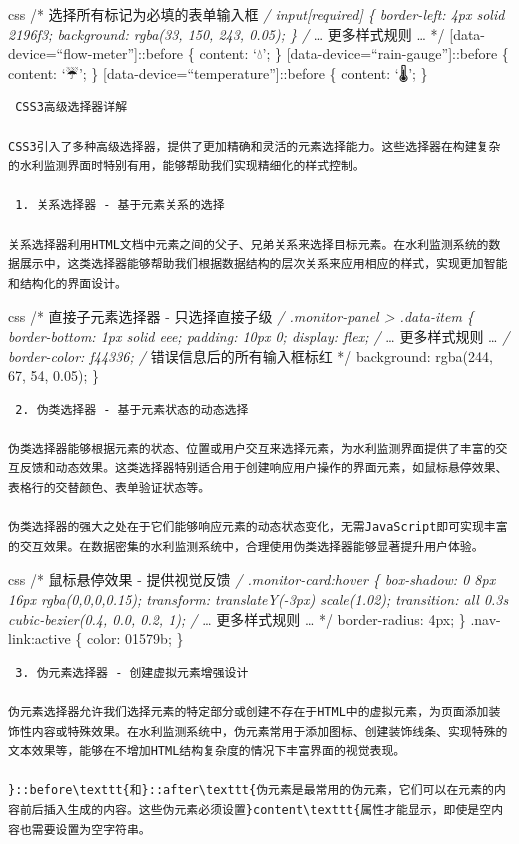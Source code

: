 css /* 选择所有标记为必填的表单输入框 \emph{/ input{[}required{]} \{ border-left: 4px solid 2196f3; background: rgba(33, 150, 243, 0.05); \} /} \ldots{} 更多样式规则 \ldots{} */ {[}data-device=``flow-meter''{]}::before \{ content: `💧'; \} {[}data-device=``rain-gauge''{]}::before \{ content: `☔'; \} {[}data-device=``temperature''{]}::before \{ content: `🌡️'; \}

\begin{lstlisting}
 CSS3高级选择器详解

CSS3引入了多种高级选择器，提供了更加精确和灵活的元素选择能力。这些选择器在构建复杂的水利监测界面时特别有用，能够帮助我们实现精细化的样式控制。

 1. 关系选择器 - 基于元素关系的选择

关系选择器利用HTML文档中元素之间的父子、兄弟关系来选择目标元素。在水利监测系统的数据展示中，这类选择器能够帮助我们根据数据结构的层次关系来应用相应的样式，实现更加智能和结构化的界面设计。
\end{lstlisting}

css /* 直接子元素选择器 - 只选择直接子级 \emph{/ .monitor-panel \textgreater{} .data-item \{ border-bottom: 1px solid eee; padding: 10px 0; display: flex; /} \ldots{} 更多样式规则 \ldots{} \emph{/ border-color: f44336; /} 错误信息后的所有输入框标红 */ background: rgba(244, 67, 54, 0.05); \}

\begin{lstlisting}
 2. 伪类选择器 - 基于元素状态的动态选择

伪类选择器能够根据元素的状态、位置或用户交互来选择元素，为水利监测界面提供了丰富的交互反馈和动态效果。这类选择器特别适合用于创建响应用户操作的界面元素，如鼠标悬停效果、表格行的交替颜色、表单验证状态等。

伪类选择器的强大之处在于它们能够响应元素的动态状态变化，无需JavaScript即可实现丰富的交互效果。在数据密集的水利监测系统中，合理使用伪类选择器能够显著提升用户体验。
\end{lstlisting}

css /* 鼠标悬停效果 - 提供视觉反馈 \emph{/ .monitor-card:hover \{ box-shadow: 0 8px 16px rgba(0,0,0,0.15); transform: translateY(-3px) scale(1.02); transition: all 0.3s cubic-bezier(0.4, 0.0, 0.2, 1); /} \ldots{} 更多样式规则 \ldots{} */ border-radius: 4px; \} .nav-link:active \{ color: 01579b; \}

\begin{lstlisting}
 3. 伪元素选择器 - 创建虚拟元素增强设计

伪元素选择器允许我们选择元素的特定部分或创建不存在于HTML中的虚拟元素，为页面添加装饰性内容或特殊效果。在水利监测系统中，伪元素常用于添加图标、创建装饰线条、实现特殊的文本效果等，能够在不增加HTML结构复杂度的情况下丰富界面的视觉表现。

}::before\texttt{和}::after\texttt{伪元素是最常用的伪元素，它们可以在元素的内容前后插入生成的内容。这些伪元素必须设置}content\texttt{属性才能显示，即使是空内容也需要设置为空字符串。
\end{lstlisting}

